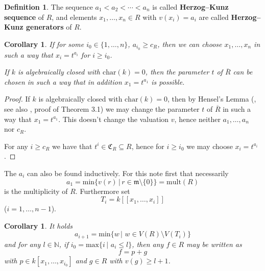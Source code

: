 \documentclass[12pt]{amsart}
\def \N{\mathbb N}
\theoremstyle{plain}%
\newtheorem{Corollary}[satz]{Corollary}
\theoremstyle{definition}
\newtheorem{definition}{Definition}[section]
\renewcommand{\(}{\left(}
\renewcommand{\)}{\right)}
\renewcommand{\leq}{\leqslant}
\renewcommand{\geq}{\geqslant}
\begin{document}
\medbreak

\begin{definition}
The sequence $a_1 < a_2 < \cdots < a_n$ is called 
\textbf{Herzog--Kunz sequence} of $R$, and elements 
$x_1, \ldots, x_n \in R$ with $v(x_i) = a_i$ are called 
\textbf{Herzog--Kunz generators} of $R$. 
\end{definition}


\begin{Corollary}\label{cor:mon_gen}
If for some $i_0 \in \{1, \ldots, n\}$, $a_{i_0} \geq c_R$, 
then we can choose $x_1, \ldots , x_n$ in such a way that 
$x_i = t^{a_i}$ for $i \geq i_0$. 

If $k$ is algebraically closed with $\mathrm{char}(k) = 0$, 
then the parameter $t$ of $\overline{R}$ can be chosen in 
such a way that in addition $x_1 = t^{a_1}$ is possible. 
\end{Corollary}

\begin{proof}
If $k$ is algebraically closed with $\mathrm{char}(k) = 0$, 
then by Hensel's Lemma (\cite[Theorem 7.3]{Ei}, see also 
\cite{HMM}, proof of Theorem 3.1) we may change the parameter 
$t$ of $\overline{R}$ in such a way that  $x_1 = t^{a_1}$. 
This doesn't change the valuation $v$, hence neither 
$a_1, \ldots, a_n$ nor $c_R$. 

For any $i \geq c_R$ we have that $t^i \in \mathfrak C_R 
\subseteq R$, hence for $i \geq i_0$ we may choose 
$x_i = t^{a_i}$. 
\end{proof}

The $a_i$ can also be found inductively. For this note first 
that necessarily 
	$$ a_1 =\mathrm{min}\{v(r)\,\vert \, r \in \mathfrak m 
    \setminus \{0\} \} = \mathrm{mult}(R) $$ 
is the multiplicity of $R$. Furthermore set 
	$$ T_i = k[[x_1,\ldots, x_i]] $$
($i = 1, \ldots, n-1$). 

\begin{Corollary}\label{cor:min_ai+1}
It holds
	$$ a_{i+1} = \mathrm{min} \{ w \,\vert \,\, w \in V(R) 
    \setminus V(T_i) \} $$
and for any $l \in \N$, if $i_0 = \mathrm{max} \{ i \, \vert 
\,\, a_i \leq l \}$, then any $f \in R$ may be written as 
	\begin{equation}\label{eq:split_val} 
	f = p + g  
	\end{equation}
with $p \in k[x_1, \ldots, x_{i_0}]$ and $g \in R$ with 
$v(g) \geq l+1$.
\end{Corollary}
\end{document}
